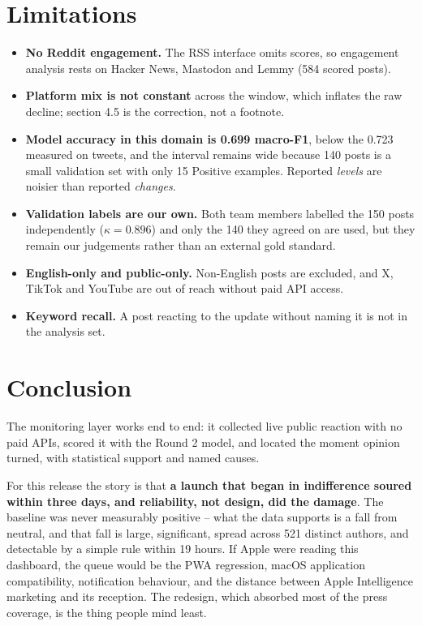 \documentclass[11pt,a4paper]{article}
\begin{document}
\section{Limitations}

\begin{itemize}[leftmargin=*]
  \item \textbf{No Reddit engagement.} The RSS interface omits scores, so engagement analysis rests on Hacker News, Mastodon and Lemmy (584 scored posts).
  \item \textbf{Platform mix is not constant} across the window, which inflates the raw decline; section 4.5 is the correction, not a footnote.
  \item \textbf{Model accuracy in this domain is 0.699 macro-F1}, below the 0.723 measured on tweets, and the interval remains wide because 140 posts is a small validation set with only 15 Positive examples. Reported \emph{levels} are noisier than reported \emph{changes}.
  \item \textbf{Validation labels are our own.} Both team members labelled the 150 posts independently ($\kappa = 0.896$) and only the 140 they agreed on are used, but they remain our judgements rather than an external gold standard.
  \item \textbf{English-only and public-only.} Non-English posts are excluded, and X, TikTok and YouTube are out of reach without paid API access.
  \item \textbf{Keyword recall.} A post reacting to the update without naming it is not in the analysis set.
\end{itemize}

\section{Conclusion}

The monitoring layer works end to end: it collected live public reaction with no paid APIs, scored it with the Round 2 model, and located the moment opinion turned, with statistical support and named causes.

For this release the story is that \textbf{a launch that began in indifference soured within three days, and reliability, not design, did the damage}. The baseline was never measurably positive -- what the data supports is a fall from neutral, and that fall is large, significant, spread across 521 distinct authors, and detectable by a simple rule within 19 hours. If Apple were reading this dashboard, the queue would be the PWA regression, macOS application compatibility, notification behaviour, and the distance between Apple Intelligence marketing and its reception. The redesign, which absorbed most of the press coverage, is the thing people mind least.
\end{document}
